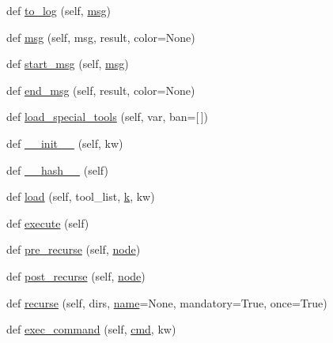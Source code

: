 \begin{DoxyCompactItemize}
\item 
def \hyperlink{classwaflib_1_1_context_1_1_context_a596fa2d8dc5a61602101f43ec1eb3e7e}{to\+\_\+log} (self, \hyperlink{classwaflib_1_1_context_1_1_context_a7495a2e04e528aa54bda3cadf08240cb}{msg})
\item 
def \hyperlink{classwaflib_1_1_context_1_1_context_a7495a2e04e528aa54bda3cadf08240cb}{msg} (self, msg, result, color=None)
\item 
def \hyperlink{classwaflib_1_1_context_1_1_context_a344a0dff2c7b0d2d76057d55b83c3f16}{start\+\_\+msg} (self, \hyperlink{classwaflib_1_1_context_1_1_context_a7495a2e04e528aa54bda3cadf08240cb}{msg})
\item 
def \hyperlink{classwaflib_1_1_context_1_1_context_a6340799a7fa4dc1230d13b7c08eec789}{end\+\_\+msg} (self, result, color=None)
\item 
def \hyperlink{classwaflib_1_1_context_1_1_context_a95a53e6c363450df77f847bec6c56696}{load\+\_\+special\+\_\+tools} (self, var, ban=\mbox{[}$\,$\mbox{]})
\item 
def \hyperlink{classwaflib_1_1_context_1_1_context_ab8fabf802b21a8a8e77c3e3811c58c84}{\+\_\+\+\_\+init\+\_\+\+\_\+} (self, kw)
\item 
def \hyperlink{classwaflib_1_1_context_1_1_context_ae8096e428213ed965d8cd5629c2481a1}{\+\_\+\+\_\+hash\+\_\+\+\_\+} (self)
\item 
def \hyperlink{classwaflib_1_1_context_1_1_context_ad214db6a7b3ce05051972f7d073a74f2}{load} (self, tool\+\_\+list, \hyperlink{rfft2d_test_m_l_8m_adc468c70fb574ebd07287b38d0d0676d}{k}, kw)
\item 
def \hyperlink{classwaflib_1_1_context_1_1_context_ae98aa77cb954743799c5b730c6775329}{execute} (self)
\item 
def \hyperlink{classwaflib_1_1_context_1_1_context_a290c81ad18ad9b3c0bcbde2d8fce519e}{pre\+\_\+recurse} (self, \hyperlink{structnode}{node})
\item 
def \hyperlink{classwaflib_1_1_context_1_1_context_ab818cd610ecc0c6fa981f0cde9f3dd13}{post\+\_\+recurse} (self, \hyperlink{structnode}{node})
\item 
def \hyperlink{classwaflib_1_1_context_1_1_context_a10e3b0d5e63bb03a0a7adbb32c3dceab}{recurse} (self, dirs, \hyperlink{lib_2expat_8h_a1b49b495b59f9e73205b69ad1a2965b0}{name}=None, mandatory=True, once=True)
\item 
def \hyperlink{classwaflib_1_1_context_1_1_context_aaa7d209a0d05f2f8e45fc11b83c72dba}{exec\+\_\+command} (self, \hyperlink{sndfile__play_8m_adfc5ba7e22f5e4a6221c12a70503bef3}{cmd}, kw)

\end{DoxyCompactItemize}
